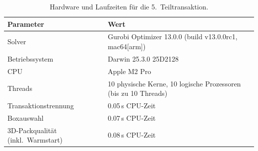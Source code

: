 \documentclass[10pt]{article}
\begin{document}
\begin{table}[H]
\centering
\begin{tabular}{|l|l|}
\hline
\textbf{Parameter} & \textbf{Wert} \\
\hline
Solver & Gurobi Optimizer 13.0.0 (build v13.0.0rc1, mac64[arm]) \\
Betriebssystem & Darwin 25.3.0 25D2128 \\
CPU & Apple M2 Pro \\
Threads & 10 physische Kerne, 10 logische Prozessoren (bis zu 10 Threads) \\
\hline
Transaktionstrennung & 0.05\,s CPU-Zeit \\
Boxauswahl & 0.07\,s CPU-Zeit \\
3D-Packqualit\"at (inkl.\ Warmstart) & 0.08\,s CPU-Zeit \\
\hline
\end{tabular}
\caption{Hardware und Laufzeiten f\"ur die 5.~Teiltransaktion.}
\label{tab:performance}
\end{table}
\end{document}

